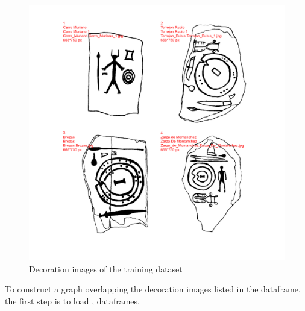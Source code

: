 \documentclass[article]{jss}\usepackage{knitr}
\begin{document}
\begin{knitrout}
\begin{figure}[H]
{\centering \includegraphics[width=\maxwidth]{figure/unnamed-chunk-4-1} 

}

\caption{\label{fig:figs}Decoration images of the training dataset}\label{fig:unnamed-chunk-4}
\end{figure}


\end{knitrout}

To construct a graph overlapping the decoration images listed in the  dataframe, the first step is to load ,  dataframes.

\begin{knitrout}
\color{fgcolor}\begin{kframe}
\begin{alltt}
 \hlkwb{<-} \hlstd{(}\hlstd{(}\hlstd{,} \hlstd{,}  \hlstd{=} \hlstd{),}
\hlstd{+ }                    \hlstd{=}\hlstd{,} \hlstd{=} \hlstd{)}
 \hlkwb{<-} \hlstd{(}\hlstd{(}\hlstd{,} \hlstd{,}  \hlstd{=} \hlstd{),}
\hlstd{+ }                    \hlstd{=}\hlstd{,} \hlstd{=} \hlstd{)}
\end{alltt}
\end{kframe}
\end{knitrout}
\end{document}
